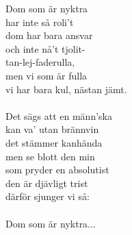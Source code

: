 
            Dom som är nyktra \\
            har inte så roli't \\
            dom har bara ansvar \\
            och inte nå't tjolit- \\
            tan-lej-faderulla, \\
            men vi som är fulla \\
            vi har bara kul, nästan jämt. \\
\hspace{10mm} \\
            Det sägs att en männ'ska \\
            kan va' utan brännvin \\
            det stämmer kanhända \\
            men se blott den min \\
            som pryder en absolutist \\
            den är djävligt trist \\
            därför sjunger vi så: \\
\hspace{10mm} \\
            Dom som är nyktra... \\
